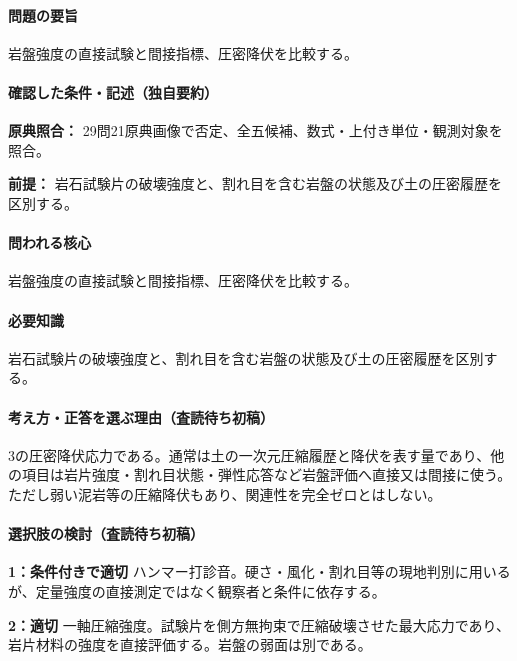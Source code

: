 \paragraph{問題の要旨} 岩盤強度の直接試験と間接指標、圧密降伏を比較する。

\paragraph{確認した条件・記述（独自要約）}\mbox{}\par

\noindent\textbf{原典照合：} 29問21原典画像で否定、全五候補、数式・上付き単位・観測対象を照合。\par

\noindent\textbf{前提：} 岩石試験片の破壊強度と、割れ目を含む岩盤の状態及び土の圧密履歴を区別する。\par

\paragraph{問われる核心} 岩盤強度の直接試験と間接指標、圧密降伏を比較する。

\paragraph{必要知識} 岩石試験片の破壊強度と、割れ目を含む岩盤の状態及び土の圧密履歴を区別する。

\paragraph{考え方・正答を選ぶ理由（査読待ち初稿）} 3の圧密降伏応力である。通常は土の一次元圧縮履歴と降伏を表す量であり、他の項目は岩片強度・割れ目状態・弾性応答など岩盤評価へ直接又は間接に使う。ただし弱い泥岩等の圧縮降伏もあり、関連性を完全ゼロとはしない。

\paragraph{選択肢の検討（査読待ち初稿）}\mbox{}\par

\noindent\textbf{1：条件付きで適切} ハンマー打診音。硬さ・風化・割れ目等の現地判別に用いるが、定量強度の直接測定ではなく観察者と条件に依存する。\par

\noindent\textbf{2：適切} 一軸圧縮強度。試験片を側方無拘束で圧縮破壊させた最大応力であり、岩片材料の強度を直接評価する。岩盤の弱面は別である。\par

